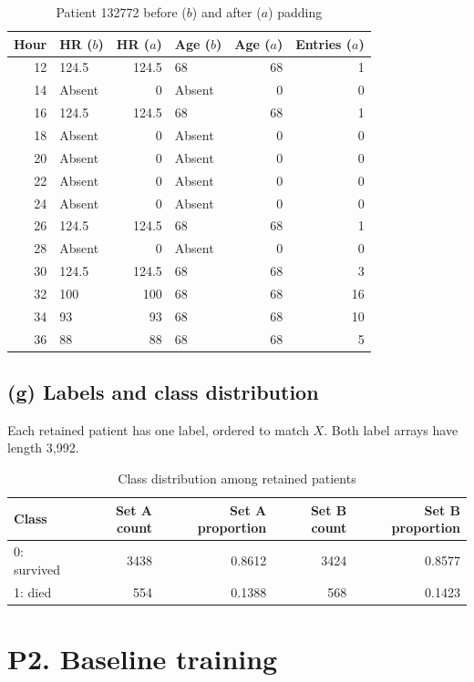 \documentclass[11pt,a4paper]{article}
\begin{document}
\begin{table}[H]
\centering
\caption{Patient 132772 before ($b$) and after ($a$) padding}\label{tab:padding}
\begin{tabular}{rlrlrr}
\toprule
Hour & HR ($b$) & HR ($a$) & Age ($b$) & Age ($a$) & Entries ($a$)\\
\midrule
12 & 124.5 & 124.5 & 68 & 68 & 1 \\
14 & Absent & 0 & Absent & 0 & 0 \\
16 & 124.5 & 124.5 & 68 & 68 & 1 \\
18 & Absent & 0 & Absent & 0 & 0 \\
20 & Absent & 0 & Absent & 0 & 0 \\
22 & Absent & 0 & Absent & 0 & 0 \\
24 & Absent & 0 & Absent & 0 & 0 \\
26 & 124.5 & 124.5 & 68 & 68 & 1 \\
28 & Absent & 0 & Absent & 0 & 0 \\
30 & 124.5 & 124.5 & 68 & 68 & 3 \\
32 & 100 & 100 & 68 & 68 & 16 \\
34 & 93 & 93 & 68 & 68 & 10 \\
36 & 88 & 88 & 68 & 68 & 5 \\
\bottomrule
\end{tabular}
\end{table}

\subsection*{(g) Labels and class distribution}
Each retained patient has one label, ordered to match $X$.
Both label arrays have length 3,992.

\begin{table}[H]
\centering
\caption{Class distribution among retained patients}\label{tab:classes}
\begin{tabular}{lrrrr}
\toprule
Class & Set A count & Set A proportion & Set B count & Set B proportion\\
\midrule
0: survived & 3438 & 0.8612 & 3424 & 0.8577\\
1: died & 554 & 0.1388 & 568 & 0.1423\\
\bottomrule
\end{tabular}
\end{table}

\clearpage
\section*{P2. Baseline training}
\end{document}

